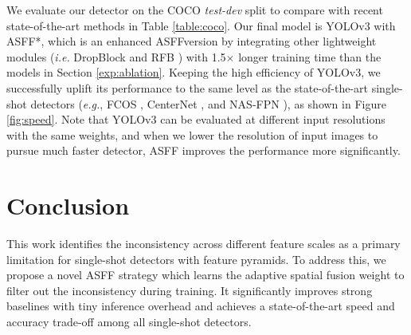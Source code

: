 \documentclass[10pt,twocolumn,letterpaper]{article}
\begin{document}
We evaluate our detector on the COCO \emph{test-dev} split to compare with recent state-of-the-art methods in Table \ref{table:coco}. Our final model is YOLOv3 with ASFF*, which is an enhanced ASFFversion by integrating other lightweight modules (\emph{i.e.} DropBlock \cite{dropblock} and RFB \cite{RFB}) with 1.5$\times$ longer training time than the models in Section \ref{exp:ablation}. 
Keeping the high efficiency of YOLOv3, we successfully uplift its performance to the same level as the state-of-the-art single-shot detectors (\emph{e.g.}, FCOS \cite{fcos}, CenterNet \cite{objects}, and NAS-FPN \cite{nas-fpn}), as shown in Figure \ref{fig:speed}. Note that YOLOv3 can be evaluated at different input resolutions with the same weights, and when we lower the resolution of input images to pursue much faster detector, ASFF improves the performance more significantly. 

\section{Conclusion}

This work identifies the inconsistency across different feature scales as a primary limitation for single-shot detectors with feature pyramids. To address this, we propose a novel ASFF strategy which learns the adaptive spatial fusion weight to filter out the inconsistency during training. It significantly improves strong baselines with tiny inference overhead and achieves a state-of-the-art speed and accuracy trade-off among all single-shot detectors.


{\small
	
	
}
\end{document}
